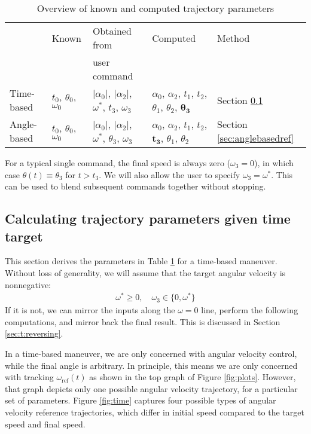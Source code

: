 \documentclass[12pt, a4paper]
{article}
\providecommand{\sub}[1]{_{\text{#1}}}
\providecommand{\w}{\omega}
\providecommand{\wt}{\w^*}
\providecommand{\wref}{\w\sub{ref}}
\renewcommand{\th}{\theta}
\renewcommand{\a}{\alpha}
\providecommand{\abs}[1]{\left|#1\right|}
\begin{document}
\begin{table}[H]
    \centering
    \caption{Overview of known and computed trajectory parameters}
    \label{tab:parameters}
    \begin{tabular}{@{}lllll@{}}
    \toprule
                & Known    & Obtained from & Computed & Method \\
                &          & user command  &          &        \\ \midrule
    Time-based  &
        $t_0$, $\th_0$, $\w_0$ &
        $\abs{\a_0}$, $\abs{\a_2}$, $\wt$, $t_3$, $\w_3$ &
        $\a_0$, $\a_2$, $t_1$, $t_2$, $\th_1$, $\th_2$, $\boldsymbol{\th_3}$
        & Section \ref{sec:timebasedref}\\
    Angle-based &
        $t_0$, $\th_0$, $\w_0$ &
        $\abs{\a_0}$, $\abs{\a_2}$, $\wt$, $\th_3$, $\w_3$ &
        $\a_0$, $\a_2$, $t_1$, $t_2$, $\boldsymbol{t_3}$, $\th_1$, $\th_2$ &
        Section \ref{sec:anglebasedref}  \\
        \bottomrule
    \end{tabular}
\end{table}

For a typical single command, the final speed is always zero ($\w_3 = 0$), in
which case $\th(t) \equiv \th_3$ for $t > t_3$. We will also allow the user to
specify $\w_3 = \wt$. This can be used to blend subsequent commands together
without stopping.


\subsection{Calculating trajectory parameters given time target}
\label{sec:timebasedref}
This section derives the parameters in Table \ref{tab:parameters} for a
time-based maneuver. Without loss of generality, we will assume that the
target angular velocity is nonnegative:
%
\begin{align}
    \label{eq:t:forwardmaneuver}
    \wt \geq 0, \quad \w_3 \in \{0, \wt\}
\end{align}
%
If it is not, we can mirror the inputs along the $\w=0$ line, perform the
following computations, and mirror back the final result. This is discussed
in Section \ref{sec:t:reversing}.

In a time-based maneuver, we are only concerned with angular velocity control,
while the final angle is arbitrary. In principle, this means we are only
concerned with tracking $\wref(t)$ as shown in the top graph of
Figure \ref{fig:plots}. However, that graph depicts only one possible angular
velocity trajectory, for a particular set of parameters.
Figure \ref{fig:time} captures four possible types of angular velocity
reference trajectories, which differ in initial speed compared to the
target speed and final speed.
\end{document}
